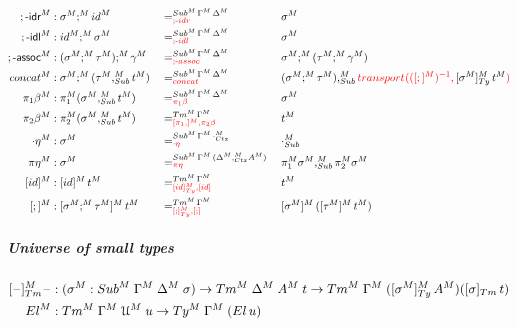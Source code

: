 \documentclass[a4paper,UKenglish,numberwithinsect,cleveref,thm-restate]{lipics-v2021}
\begin{document}
\begin{alignat*}{5}
  ;\text{-}\textsf{idr}^M   & : \sigma^M ;^M \idS^M && =^{\Sub^M\,\Gamma^M\,\Delta^M}_{\alert{;\text{-}\mathsf{idr}}} && \sigma^M \\
  ;\text{-}\textsf{idl}^M   & : \idS^M ;^M \sigma^M && =^{\Sub^M\,\Gamma^M\,\Delta^M}_{\alert{;\text{-}\mathsf{idl}}} && \sigma^M \\
  ;\text{-}\textsf{assoc}^M & : (\sigma^M ;^M \tau^M) ;^M \gamma^M   && =^{\Sub^M\,\Gamma^M\,\Delta^M}_{\alert{;\text{-}\mathsf{assoc}}} && \sigma^M ;^M (\tau^M ;^M \gamma^M) \\
  \mathsf{concat}^M         & : \sigma^M ;^M (\tau^M ,_{\Sub}^M t^M) && =^{\Sub^M\,\Gamma^M\,\Delta^M}_{\alert{\mathsf{concat}}} && (\sigma^M ;^M \tau^M) ,_{\Sub}^M \alert{\transfib{}{([;]^M)^{-1}}{\color{black}[\sigma^M]_{\Ty}^M\,t^M}} \\
  \pi_1\beta^M              & : \pi_1^M (\sigma^M ,^M_{\Sub} t^M)    && =^{\Sub^M\,\Gamma^M\,\Delta^M}_{\alert{\pi_1\beta}}      && \sigma^M \\
  \pi_2\beta^M              & : \pi_2^M (\sigma^M ,^M_{\Sub} t^M)    && =^{\Tm^M\,\Gamma^M}_{\alert{[\pi_1,]^M, \pi_2\beta}}       && t^M \\
  \cdot\eta^M               & : \sigma^M                             && =^{\Sub^M\,\Gamma^M\,\emptyctx^M_{\Ctx}}_{\alert{\cdot\eta}}  && \emptysub_{\Sub}^M \\
  \pi\eta^M                 & : \sigma^M                             && =^{\Sub^M\,\Gamma^M\,(\Delta^M ,^M_{\Ctx} A^M)}_{\alert{\pi\eta}} {} && \pi_1^M \sigma^M ,_{\Sub}^M \pi_2^M \sigma^M \\
  [\idS]^M                  & : [ \idS ]^M\,t^M                      && =^{\Tm^M\,\Gamma^M}_{\alert{[\idS]^M_{\Ty}, [\idS]}} && t^M \\
  [;]^M                     & : [ \sigma^M ;^M \tau^M ]^M\,t^M       && =^{\Tm^M\,\Gamma^M}_{\alert{[;]^M_{\Ty}, [;]}} && [\sigma^M]^M\,([\tau^M]^M\,t^M) 
\end{alignat*}

\subparagraph*{Universe of small types}
\begin{alignat*}{10}
  [\blank]_{\Tm}^M\blank & : (\sigma^M : \Sub^M\;\Gamma^M\;\Delta^M\;\sigma) \to \Tm^M\;\Delta^M\;A^M\;t \to \Tm^M\;\Gamma^M\;([\sigma^M]_{\Ty}^M\,A^M)([\sigma]_{\Tm}\,t) \\
  \El^M                  & : \Tm^M\;\Gamma^M\;\UU^M\;u \to \Ty^M\;\Gamma^M\;(\El\,u)
\end{alignat*}
\end{document}
